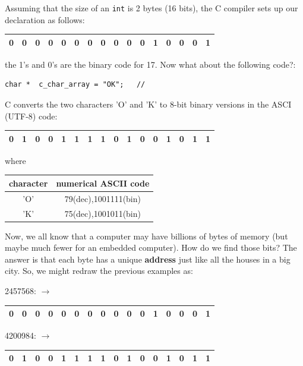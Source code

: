 \documentclass{article}	%
\begin{document}
Assuming that the size of an {\tt int} is 2 bytes (16 bits), the C compiler sets up our 
declaration as follows:

\vspace{0.1in}

\begin{tabular}{|c|c|c|c|c|c|c|c|c|c|c|c|c|c|c|c|}\hline
0&0&0&0&0&0&0&0&0&0&0&1&0&0&0&1\\\hline
\end{tabular}

\vspace{0.1in}
the 1's and 0's are the binary code for 17.  Now what about the following code?:

\begin{verbatim}
char *  c_char_array = "OK";   // 
\end{verbatim}
C converts the two characters 'O' and 'K' to 8-bit binary versions in the ASCI (UTF-8) code:

\vspace{0.1in}
\begin{tabular}{|c|c|c|c|c|c|c|c|c|c|c|c|c|c|c|c|}\hline
0&1&0&0 & 1&1&1&1 & 0&1&0&0 & 1&0&1&1\\\hline
\end{tabular}
\vspace{0.1in}
where 

\begin{tabular}{|c|c|} \hline
character  & numerical ASCII code \\ \hline
'O'  & 79(dec),1001111(bin) \\ \hline
'K'  & 75(dec),1001011(bin) \\ \hline
\end{tabular}

Now, we all know that a computer may have billions of bytes of memory (but maybe much fewer
for an embedded computer).   How do we find those bits?  The answer is that each 
byte has a unique {\bf address} just like all the houses in a big city.   So, we might redraw the previous 
examples as:




\vspace{0.1in}
2457568: $\to$ \begin{tabular}{|c|c|c|c|c|c|c|c|c|c|c|c|c|c|c|c|}\hline
0&0&0&0&0&0&0&0&0&0&0&1&0&0&0&1\\\hline
\end{tabular}
\vspace{0.1in}

4200984: $\to$ \begin{tabular}{|c|c|c|c|c|c|c|c|c|c|c|c|c|c|c|c|}\hline
0&1&0&0 & 1&1&1&1 & 0&1&0&0 & 1&0&1&1\\\hline
\end{tabular}
\vspace{0.1in}
\end{document}
